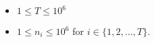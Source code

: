 \begin{itemize}
\tightlist
\item $1\le T\le 10^6$
\item $1 \le n_i \le 10^6$ for $i \in \{1,2,\dots,T\}$.
\end{itemize}
